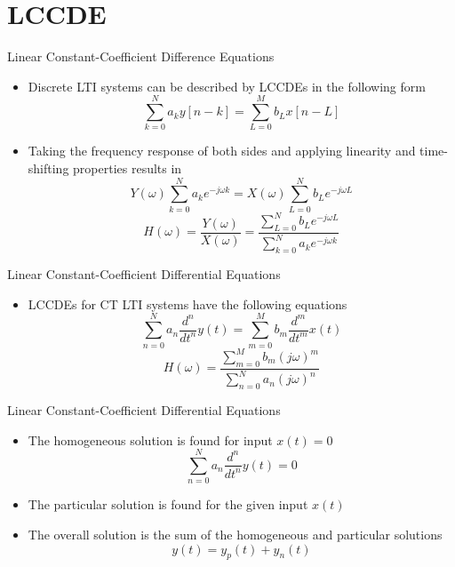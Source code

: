 \section{LCCDE}

\begin{frame}{Linear Constant-Coefficient Difference Equations}

    \begin{itemize}
        \item Discrete LTI systems can be described by LCCDEs in the following form
            \[
                \sum_{k=0}^N a_{k}y[n-k] = \sum_{L=0}^M b_{L}x[n-L]
            \]
        \item Taking the frequency response of both sides and applying linearity and time-shifting properties results in
            \[
                Y(\omega)\sum_{k=0}^N a_{k}e^{-j\omega k} = X(\omega)\sum_{L=0}^N b_{L}e^{-j\omega L}
            \]
            \[
                H(\omega) = \frac{Y(\omega)}{X(\omega)} = \frac{\sum_{L=0}^N b_{L}e^{-j\omega L}}{\sum_{k=0}^N a_{k}e^{-j\omega k}}
            \]
    \end{itemize}

\end{frame}

\begin{frame}{Linear Constant-Coefficient Differential Equations}
    \begin{itemize}
        \item LCCDEs for CT LTI systems have the following equations
            \[
                \sum_{n=0}^N a_n \frac{d^{n}}{dt^n} y(t) = \sum_{m=0}^M b_m \frac{d^{m}}{dt^m} x(t)
            \]
            \[
                H(\omega) = \frac{\sum_{m=0}^M b_m (j\omega)^m} {\sum_{n=0}^N a_n (j\omega)^n}
            \]
    \end{itemize}

\end{frame}

\begin{frame}{Linear Constant-Coefficient Differential Equations}
    \begin{itemize}
        \item The homogeneous solution is found for input $x(t) = 0$
            \[
                \sum_{n=0}^N a_n \frac{d^{n}}{dt^n} y(t) = 0
            \]
        \item The particular solution is found for the given input $x(t)$
        \item The overall solution is the sum of the homogeneous and particular solutions
        \[ y(t) = y_p(t) + y_n(t)
        \]
    \end{itemize}

\end{frame}

